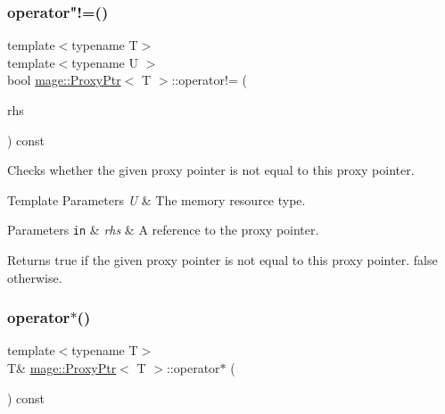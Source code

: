\subsubsection{\texorpdfstring{operator"!=()}{operator!=()}}
{\footnotesize\ttfamily template$<$typename T$>$ \\
template$<$typename U $>$ \\
bool \mbox{\hyperlink{classmage_1_1_proxy_ptr}{mage\+::\+Proxy\+Ptr}}$<$ T $>$\+::operator!= (\begin{DoxyParamCaption}\item[{const \mbox{\hyperlink{classmage_1_1_proxy_ptr}{Proxy\+Ptr}}$<$ U $>$ \&}]{rhs }\end{DoxyParamCaption}) const\hspace{0.3cm}{\ttfamily [noexcept]}}

Checks whether the given proxy pointer is not equal to this proxy pointer.


\begin{DoxyTemplParams}{Template Parameters}
{\em U} & The memory resource type. \\
\hline
\end{DoxyTemplParams}

\begin{DoxyParams}[1]{Parameters}
\mbox{\tt in}  & {\em rhs} & A reference to the proxy pointer. \\
\hline
\end{DoxyParams}
\begin{DoxyReturn}{Returns}
{\ttfamily true} if the given proxy pointer is not equal to this proxy pointer. {\ttfamily false} otherwise. 
\end{DoxyReturn}
\mbox{\label{classmage_1_1_proxy_ptr_aaf7b96ea7e8350ce5f2ae1f504627fd9}} 
\subsubsection{\texorpdfstring{operator$\ast$()}{operator*()}}
{\footnotesize\ttfamily template$<$typename T$>$ \\
T\& \mbox{\hyperlink{classmage_1_1_proxy_ptr}{mage\+::\+Proxy\+Ptr}}$<$ T $>$\+::operator$\ast$ (\begin{DoxyParamCaption}{ }\end{DoxyParamCaption}) const\hspace{0.3cm}{\ttfamily [noexcept]}}

